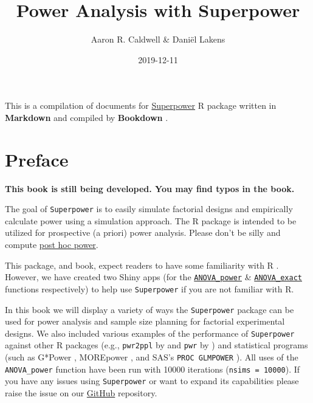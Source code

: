 \documentclass[
]{book}
\title{Power Analysis with Superpower}
\author{Aaron R. Caldwell \& Daniël Lakens}
\date{2019-12-11}
\begin{document}
\maketitle

{
\setcounter{tocdepth}{1}
\tableofcontents
}
This is a compilation of documents for \href{https://github.com/arcaldwell49/Superpower}{Superpower} R package written in \textbf{Markdown} \citep{R-rmarkdown} and compiled by \textbf{Bookdown} \citep{R-bookdown}.

\hypertarget{preface}{%
\chapter*{Preface}\label{preface}}

\textbf{This book is still being developed. You may find typos in the book.}

The goal of \texttt{Superpower} is to easily simulate factorial designs and empirically calculate power using a simulation approach.
The R package is intended to be utilized for prospective (a priori) power analysis. Please don't be silly and compute \href{https://discourse.datamethods.org/t/reference-collection-to-push-back-against-common-statistical-myths/1787}{post hoc power}.

This package, and book, expect readers to have some familiarity with R \citeyearpar{R-base}. However, we have created two Shiny apps (for the \href{https://aaroncaldwell.us/shiny/anova_power}{\texttt{ANOVA\_power}} \& \href{https://aaroncaldwell.us/shiny/anova_exact}{\texttt{ANOVA\_exact}} functions respectively) to help use \texttt{Superpower} if you are not familiar with R.

In this book we will display a variety of ways the \texttt{Superpower} package can be used for power analysis and sample size planning for factorial experimental designs. We also included various examples of the performance of \texttt{Superpower} against other R packages (e.g., \texttt{pwr2ppl} by \citet{R-pwr2ppl} and \texttt{pwr} by \citet{R-pwr}) and statistical programs (such as G*Power \citet{faul2007g}, MOREpower \citet{Campbell2012MorePower6F}, and SAS's \texttt{PROC\ GLMPOWER} \citeyearpar{SASglmpower}). All uses of the \texttt{ANOVA\_power} function have been run with 10000 iterations (\texttt{nsims\ =\ 10000}). If you have any issues using \texttt{Superpower} or want to expand its capabilities please raise the issue on our \href{https://github.com/arcaldwell49/Superpower/issues}{GitHub} repository.
\end{document}
